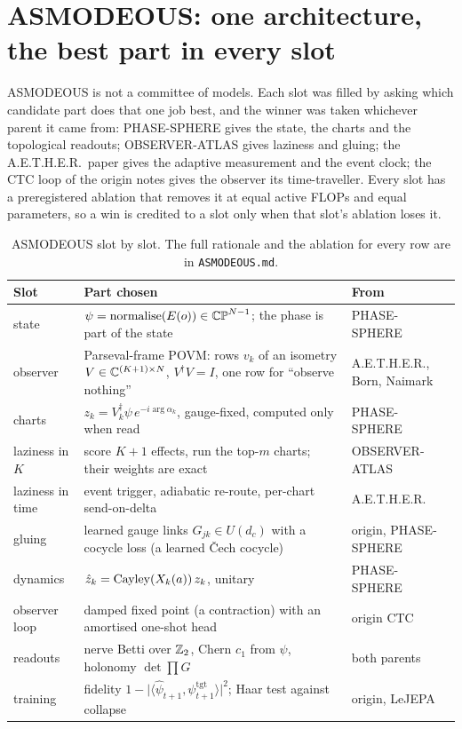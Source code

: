 \section{ASMODEOUS: one architecture, the best part in every slot}\label{sec:asmodeous}

ASMODEOUS is not a committee of models. Each slot was filled by asking which candidate part does that one job best, and the winner was taken whichever parent it came from: PHASE-SPHERE gives the state, the charts and the topological readouts; OBSERVER-ATLAS gives laziness and gluing; the A.E.T.H.E.R.\ paper gives the adaptive measurement and the event clock; the CTC loop of the origin notes gives the observer its time-traveller. Every slot has a preregistered ablation that removes it at equal active FLOPs and equal parameters, so a win is credited to a slot only when that slot's ablation loses it.



\begin{table}[h]
\centering\small
\begin{tabular}{@{}p{2.6cm}p{8.6cm}p{3.2cm}@{}}
\toprule
Slot & Part chosen & From \\
\midrule
state & $\psi=\mathrm{normalise}(E(o))\in\mathbb{CP}^{N-1}$; the phase is part of the state & PHASE-SPHERE \\
observer & Parseval-frame POVM: rows $v_k$ of an isometry $V\in\mathbb{C}^{(K+1)\times N}$, $V^\dagger V=I$, one row for ``observe nothing'' & A.E.T.H.E.R., Born, Naimark \\
charts & $z_k=V_k^\dagger\psi\,e^{-i\arg\alpha_k}$, gauge-fixed, computed only when read & PHASE-SPHERE \\
laziness in $K$ & score $K{+}1$ effects, run the top-$m$ charts; their weights are exact & OBSERVER-ATLAS \\
laziness in time & event trigger, adiabatic re-route, per-chart send-on-delta & A.E.T.H.E.R. \\
gluing & learned gauge links $G_{jk}\in U(d_c)$ with a cocycle loss (a learned \v{C}ech cocycle) & origin, PHASE-SPHERE \\
dynamics & $\hat z_k=\operatorname{Cayley}(X_k(a))\,z_k$, unitary & PHASE-SPHERE \\
observer loop & damped fixed point (a contraction) with an amortised one-shot head & origin CTC \\
readouts & nerve Betti over $\mathbb{Z}_2$, Chern $c_1$ from $\psi$, holonomy $\det\prod G$ & both parents \\
training & fidelity $1-\lvert\langle\hat\psi_{t+1},\psi^{\mathrm{tgt}}_{t+1}\rangle\rvert^2$; Haar test against collapse & origin, LeJEPA \\
\bottomrule
\end{tabular}
\caption{ASMODEOUS slot by slot. The full rationale and the ablation for every row are in \texttt{ASMODEOUS.md}.}
\end{table}

